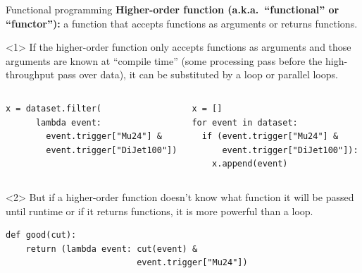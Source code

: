 \documentclass[aspectratio=169]{beamer}
\begin{document}
\begin{frame}[fragile]{Functional programming}
\vspace{0.5 cm}
{\bf Higher-order function (a.k.a.\ ``functional'' or ``functor''):} a function that accepts functions as arguments or returns functions.

\vspace{0.5 cm}
\begin{onlyenv}<1>
If the higher-order function only accepts functions as arguments and those arguments are known at ``compile time'' (some processing pass before the high-throughput pass over data), it can be substituted by a loop or parallel loops.

\small
\begin{columns}[t]
\begin{verbatim}
x = dataset.filter(
      lambda event:
        event.trigger["Mu24"] &
        event.trigger["DiJet100"])
\end{verbatim}

\begin{verbatim}
x = []
for event in dataset:
  if (event.trigger["Mu24"] &
      event.trigger["DiJet100"]):
    x.append(event)
\end{verbatim}
\end{columns}
\end{onlyenv}
\begin{onlyenv}<2>
But if a higher-order function doesn't know what function it will be passed until runtime or if it returns functions, it is more powerful than a loop.

\small
\begin{center}
\begin{minipage}{0.8\linewidth}
\begin{verbatim}
def good(cut):
    return (lambda event: cut(event) &
                          event.trigger["Mu24"])
\end{verbatim}
\end{minipage}
\end{center}

\vspace{1.2 cm}
\end{onlyenv}
\end{frame}
\end{document}
